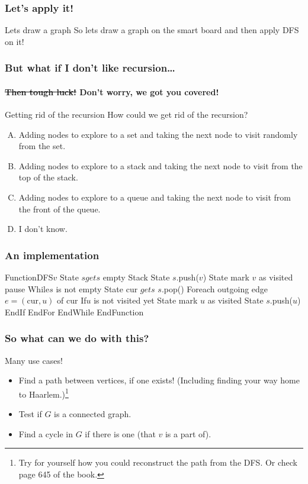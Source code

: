 \begin{frame}
	\frametitle{Let's apply it!}

	\begin{block}{Lets draw a graph}
		So lets draw a graph on the smart board and then apply DFS on it!
	\end{block}
\end{frame}

\begin{frame}
	\frametitle{But what if I don't like recursion\dots}
	\framesubtitle{\st{Then tough luck!} Don't worry, we got you covered!}

	\begin{block}{Getting rid of the recursion}
		How could we get rid of the recursion?
		\begin{enumerate}[A.]
			\item Adding nodes to explore to a set and taking the next node to visit randomly from the set.
			\item Adding nodes to explore to a stack and taking the next node to visit from the top of the stack.
			\item Adding nodes to explore to a queue and taking the next node to visit from the front of the queue.
			\item I don't know.
		\end{enumerate}
	\end{block}
\end{frame}

\begin{frame}
	\frametitle{An implementation}
	
	\begin{block}
		Function{DFS}{$v$}
		State $s gets$ empty Stack
		State $s$.push($v$)
		State mark $v$ as visited
		pause
		While{$s$ is not empty}
		State cur $gets$ $s$.pop()
		\pause
		For{each outgoing edge $e=(\text{cur},u)$ of $\text{cur}$}
		If{$u$ is not visited yet}
		State mark $u$ as visited
		\pause
		State $s$.push($u$)
		EndIf
		EndFor
		EndWhile
		EndFunction
	\end{block}
\end{frame}

\begin{frame}
	\frametitle{So what can we do with this?}

		\begin{block}{Many use cases!}
			\begin{itemize}
				\item Find a path between vertices, if one exists! (Including finding your way home to Haarlem.)\footnote{Try for
					yourself how you could reconstruct the path from the DFS. Or check page 645 of the book.}
					\pause
				\item Test if $G$ is a connected graph.
					\pause
				\item Find a cycle in $G$ if there is one (that $v$ is a part of).
			\end{itemize}
			
		\end{block}	
\end{frame}

